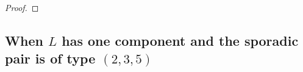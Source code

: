 \documentclass{amsart}
\newcommand{\pp}{\mathbb{P}}
\theoremstyle{definition}
\theoremstyle{remark}
\numberwithin{equation}{section}
\begin{document}
\begin{proof}

\end{proof}



\subsection{When $L$ has one component and the sporadic pair is of type $(2,3,5)$}
\end{document}
